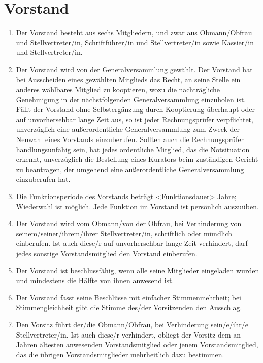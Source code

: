 \documentclass[a4paper,12pt]{article}
\begin{document}
\section{Vorstand} %
\label{sec:Vorstand}
\begin{enumerate}
\item\label{item:vorstand-mitglieder} Der Vorstand besteht aus sechs Mitgliedern, und zwar aus Obmann/Obfrau und Stellvertreter/in, Schriftführer/in und Stellvertreter/in sowie Kassier/in und Stellvertreter/in.
\item\label{item:vorstand-wahlen} Der Vorstand wird von der Generalversammlung gewählt. Der Vorstand hat bei Ausscheiden eines gewählten Mitglieds das Recht, an seine Stelle ein anderes wählbares Mitglied zu kooptieren, wozu die nachträgliche Genehmigung in der nächstfolgenden Generalversammlung einzuholen ist. Fällt der Vorstand ohne Selbstergänzung durch Kooptierung überhaupt oder auf unvorhersehbar lange Zeit aus, so ist jeder Rechnungsprüfer verpflichtet, unverzüglich eine außerordentliche Generalversammlung zum Zweck der Neuwahl eines Vorstands einzuberufen. Sollten auch die Rechnungsprüfer handlungsunfähig sein, hat jedes ordentliche Mitglied, das die Notsituation erkennt, unverzüglich die Bestellung eines Kurators beim zuständigen Gericht zu beantragen, der umgehend eine außerordentliche Generalversammlung einzuberufen hat.
\item\label{item:vorstand-dauer} Die Funktionsperiode des Vorstands beträgt <Funktionsdauer> Jahre; %
 Wiederwahl ist möglich. Jede Funktion im Vorstand ist persönlich auszuüben.
\item Der Vorstand wird vom Obmann/von der Obfrau, bei Verhinderung von seinem/seiner/ihrem/ihrer Stellvertreter/in, schriftlich oder mündlich einberufen. Ist auch diese/r auf unvorhersehbar lange Zeit verhindert, darf jedes sonstige Vorstandsmitglied den Vorstand einberufen.

\item Der Vorstand ist beschlussfähig, wenn alle seine Mitglieder eingeladen wurden und mindestens die Hälfte von ihnen anwesend ist.

\item Der Vorstand fasst seine Beschlüsse mit einfacher Stimmenmehrheit; bei Stimmengleichheit gibt die Stimme des/der Vorsitzenden den Ausschlag.

\item Den Vorsitz führt der/die Obmann/Obfrau, bei Verhinderung sein/e/ihr/e Stellvertreter/in. Ist auch diese/r verhindert, obliegt der Vorsitz dem an Jahren ältesten anwesenden Vorstandsmitglied oder jenem Vorstandsmitglied, das die übrigen Vorstandsmitglieder mehrheitlich dazu bestimmen.


\end{enumerate}
\end{document}
